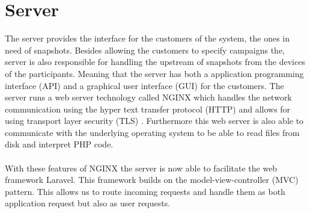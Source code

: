 \section{Server}
The server provides the interface for the customers of the system, the ones in need of snapshots. Besides allowing the customers to specify campaigns the, server is also responsible for handling the upstream of snapshots from the devices of the participants. Meaning that the server has both a application programming interface (API)  and a graphical user interface (GUI)  for the customers. The server runs a web server technology called NGINX which handles the network communication using the hyper text transfer protocol (HTTP)  and allows for using transport layer security (TLS) . Furthermore this web server is also able to communicate with the underlying operating system to be able to read files from disk and interpret PHP code.
\\\\
With these features of NGINX the server is now able to facilitate the web framework Laravel. This framework builds on the model-view-controller (MVC) pattern. This allows us to route incoming requests and handle them as both application request but also as user requests. 

